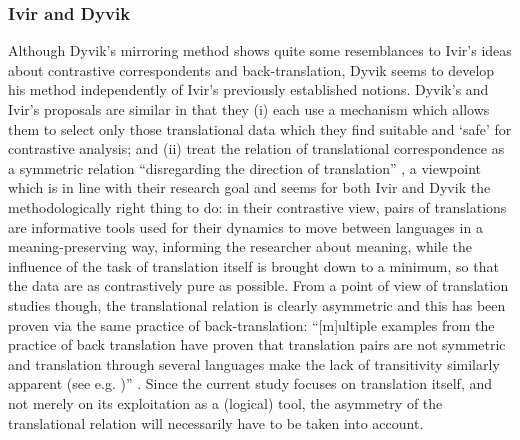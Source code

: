 \subsubsection{Ivir and Dyvik} 
\label{sec:2.3.4.3}  
Although Dyvik’s mirroring method shows quite some resemblances to Ivir’s ideas about contrastive correspondents and back-translation, Dyvik seems to develop his method independently of Ivir’s previously established notions. Dyvik’s and Ivir’s proposals are similar in that they (i) each use a mechanism which allows them to select only those translational data which they find suitable and ‘safe’ for contrastive analysis; and (ii) treat the relation of translational correspondence as a symmetric relation “disregarding the direction of translation” \citep[314]{aijmer_translations_2004}, a viewpoint which is in line with their research goal and seems for both Ivir and Dyvik the methodologically right thing to do: in their contrastive view, pairs of translations are informative tools used for their dynamics to move between languages in a meaning-preserving way, informing the researcher about meaning, while the influence of the task of translation itself is brought down to a minimum, so that the data are as contrastively pure as possible. From a point of view of translation studies though, the translational relation is clearly asymmetric and this has been proven via the same practice of back-translation: “[m]ultiple examples from the practice of back translation have proven that translation pairs are not symmetric and translation through several languages make the lack of transitivity similarly apparent (see e.g. \citealt{Levy1989})” \citep[211]{halverson_concept_1997}. Since the current study focuses on translation itself, and not merely on its exploitation as a (logical) tool, the asymmetry of the translational relation will necessarily have to be taken into account.

